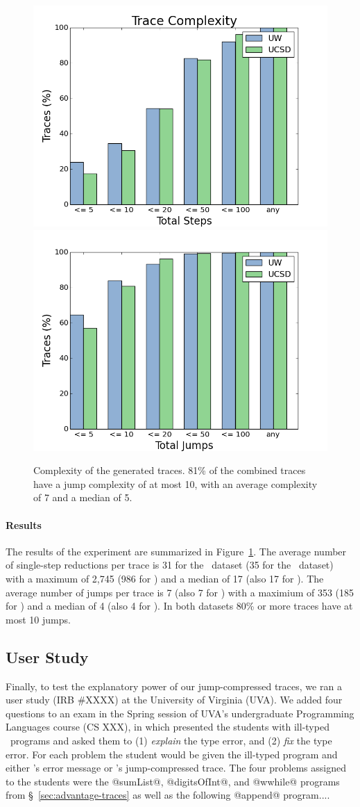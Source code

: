 %
\begin{figure}[t]
\centering
\includegraphics[width=0.49\linewidth]{trace_size_step.png}
\includegraphics[width=0.49\linewidth]{trace_size_jump.png}
\caption{Complexity of the generated traces. 81\% of the combined traces
  have a jump complexity of at most 10, with an average complexity of 7
  and a median of 5.}
\label{fig:results-complexity}
\end{figure}
%

\paragraph{Results}
\label{sec:results-complexity}
The results of the experiment are summarized in
Figure~\ref{fig:results-complexity}.
%
The average number of single-step reductions per trace is 31 for the
\ucsdbench\ dataset (35 for the \uwbench\ dataset) with a maximum of
2,745 (986 for \uwbench) and a median of 17 (also 17 for \uwbench).
%
The average number of jumps per trace is 7 (also 7 for \uwbench) with a
maximium of 353 (185 for \uwbench) and a median of 4 (also 4 for
\uwbench).
%
In both datasets 80\% or more traces have at most 10 jumps.
%



\subsection{User Study}
\label{sec:user-study}
Finally, to test the explanatory power of our jump-compressed traces, we
ran a user study (IRB \#XXXX) at the University of Virginia (UVA).
%
We added four questions to an exam in the Spring session of UVA's
undergraduate Programming Languages course (CS XXX), in which presented
the students with ill-typed \ocaml\ programs and asked them to
%
(1) \emph{explain} the type error, and
%
(2) \emph{fix} the type error.
%
For each problem the student would be given the ill-typed program and
either \ocaml's error message or \toolname's jump-compressed trace.
%
The four problems assigned to the students were the
%
@sumList@, @digitsOfInt@, and @wwhile@ programs from \S~\ref{sec:advantage-traces}
as well as the following @append@ program....

